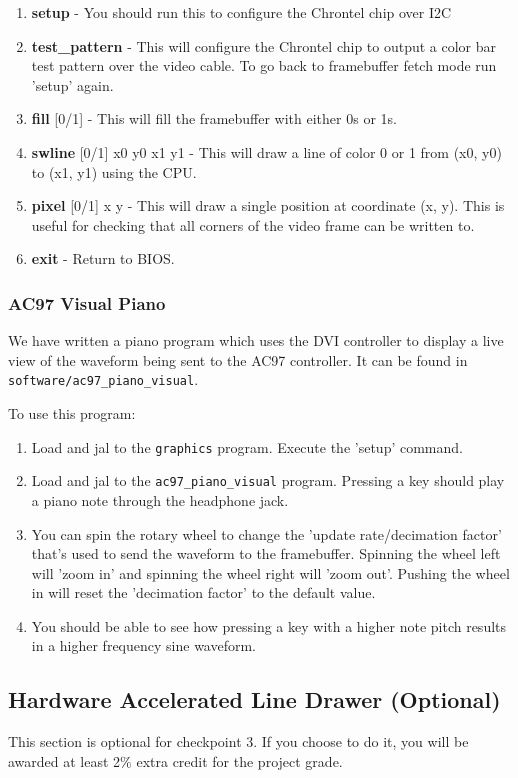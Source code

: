 \documentclass[11pt]{article}
\begin{document}
\begin{enumerate}
	\item \textbf{setup} - You should run this to configure the Chrontel chip over I2C
	\item \textbf{test\_pattern} - This will configure the Chrontel chip to output a color bar test pattern over the video cable. To go back to framebuffer fetch mode run 'setup' again.
	\item \textbf{fill} [0/1] - This will fill the framebuffer with either 0s or 1s.
	\item \textbf{swline} [0/1] x0 y0 x1 y1 - This will draw a line of color 0 or 1 from (x0, y0) to (x1, y1) using the CPU.
	\item \textbf{pixel} [0/1] x y - This will draw a single position at coordinate (x, y). This is useful for checking that all corners of the video frame can be written to.
	\item \textbf{exit} - Return to BIOS.
\end{enumerate}

\subsubsection{AC97 Visual Piano}
We have written a piano program which uses the DVI controller to display a live view of the waveform being sent to the AC97 controller. It can be found in \verb|software/ac97_piano_visual|.

To use this program:
\begin{enumerate}
	\item Load and jal to the \verb|graphics| program. Execute the 'setup' command.
	\item Load and jal to the \verb|ac97_piano_visual| program. Pressing a key should play a piano note through the headphone jack.
	\item You can spin the rotary wheel to change the 'update rate/decimation factor' that's used to send the waveform to the framebuffer. Spinning the wheel left will 'zoom in' and spinning the wheel right will 'zoom out'. Pushing the wheel in will reset the 'decimation factor' to the default value.
	\item You should be able to see how pressing a key with a higher note pitch results in a higher frequency sine waveform.
\end{enumerate}

\subsection{Hardware Accelerated Line Drawer (Optional)}
This section is optional for checkpoint 3. If you choose to do it, you will be awarded at least 2\% extra credit for the project grade.
\end{document}
